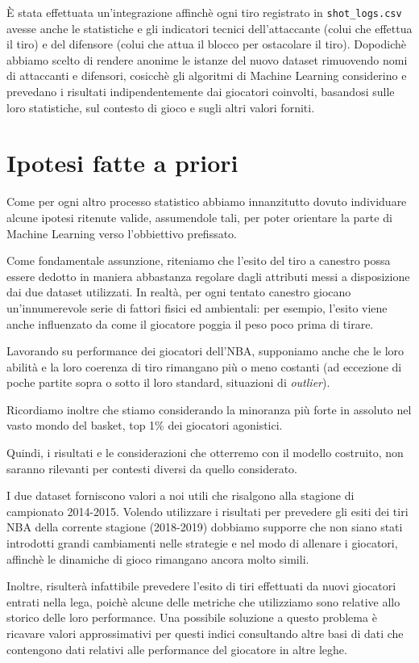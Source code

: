 
È stata effettuata un’integrazione affinchè ogni tiro registrato in \texttt{shot\_logs.csv} avesse anche le statistiche e gli indicatori tecnici dell’attaccante (colui che effettua il tiro) e del difensore (colui che attua il blocco per ostacolare il tiro). Dopodichè abbiamo scelto di rendere anonime le istanze del nuovo dataset rimuovendo nomi di attaccanti e difensori, cosicchè gli algoritmi di Machine Learning considerino e prevedano i risultati indipendentemente dai giocatori coinvolti, basandosi sulle loro statistiche, sul contesto di gioco e sugli altri valori forniti.

\section{Ipotesi fatte a priori}

Come per ogni altro processo statistico abbiamo innanzitutto dovuto individuare alcune ipotesi ritenute valide, assumendole tali, per poter orientare la parte di Machine Learning verso l’obbiettivo prefissato.
\par
Come fondamentale assunzione, riteniamo che l’esito del tiro a canestro possa essere dedotto in maniera abbastanza regolare dagli  attributi messi a disposizione dai due dataset utilizzati. In realtà, per ogni tentato canestro giocano un’innumerevole serie di fattori fisici ed ambientali: per esempio, l’esito viene anche influenzato da come il giocatore poggia il peso poco prima di tirare.
\par
Lavorando su performance dei giocatori dell’NBA, supponiamo anche che le loro abilità e la loro coerenza di tiro rimangano più o meno costanti (ad eccezione di poche partite sopra o sotto il loro standard, situazioni di \textit{outlier}).
\par
Ricordiamo inoltre che stiamo considerando la minoranza più forte in assoluto nel vasto mondo del basket, top 1\% dei giocatori agonistici. 
\par
\par
Quindi, i risultati e le considerazioni che otterremo con il modello costruito, non saranno rilevanti per contesti diversi da quello considerato.
\par
I due dataset forniscono valori a noi utili che risalgono alla stagione di campionato 2014-2015. Volendo utilizzare i risultati per prevedere gli esiti dei tiri NBA della corrente stagione (2018-2019) dobbiamo supporre che non siano stati introdotti grandi cambiamenti nelle strategie e nel modo di allenare i giocatori, affinchè le dinamiche di gioco rimangano ancora molto simili.
\par
Inoltre, risulterà infattibile prevedere l’esito di tiri effettuati da nuovi giocatori entrati nella lega, poichè alcune delle metriche che utilizziamo sono relative allo storico delle loro performance. 
Una possibile soluzione a questo problema è ricavare valori approssimativi per questi indici consultando altre basi di dati che contengono dati relativi alle performance del giocatore in altre leghe.

